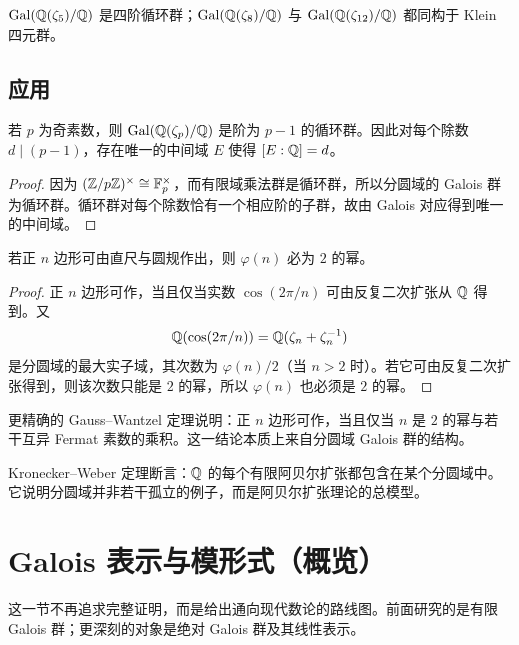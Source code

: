 \begin{example}
$\mathrm{Gal}(\mathbb{Q}(\zeta_5)/\mathbb{Q})$ 是四阶循环群；$\mathrm{Gal}(\mathbb{Q}(\zeta_8)/\mathbb{Q})$ 与 $\mathrm{Gal}(\mathbb{Q}(\zeta_{12})/\mathbb{Q})$ 都同构于 Klein 四元群。
\end{example}

\subsection*{应用}

\begin{proposition}
若 $p$ 为奇素数，则 $\mathrm{Gal}(\mathbb{Q}(\zeta_p)/\mathbb{Q})$ 是阶为 $p-1$ 的循环群。因此对每个除数 $d\mid(p-1)$，存在唯一的中间域 $E$ 使得 $[E:\mathbb{Q}]=d$。
\end{proposition}

\begin{proof}
因为 $(\mathbb{Z}/p\mathbb{Z})^\times\cong\mathbb{F}_p^\times$，而有限域乘法群是循环群，所以分圆域的 Galois 群为循环群。循环群对每个除数恰有一个相应阶的子群，故由 Galois 对应得到唯一的中间域。
\end{proof}

\begin{proposition}[正多边形可作的必要条件]
若正 $n$ 边形可由直尺与圆规作出，则 $\varphi(n)$ 必为 $2$ 的幂。
\end{proposition}

\begin{proof}
正 $n$ 边形可作，当且仅当实数 $\cos(2\pi/n)$ 可由反复二次扩张从 $\mathbb{Q}$ 得到。又
\[
\mathbb{Q}(\cos(2\pi/n))=\mathbb{Q}(\zeta_n+\zeta_n^{-1})
\]
是分圆域的最大实子域，其次数为 $\varphi(n)/2$（当 $n>2$ 时）。若它可由反复二次扩张得到，则该次数只能是 $2$ 的幂，所以 $\varphi(n)$ 也必须是 $2$ 的幂。
\end{proof}

\begin{remark}
更精确的 Gauss--Wantzel 定理说明：正 $n$ 边形可作，当且仅当 $n$ 是 $2$ 的幂与若干互异 Fermat 素数的乘积。这一结论本质上来自分圆域 Galois 群的结构。
\end{remark}

\begin{remark}
Kronecker--Weber 定理断言：$\mathbb{Q}$ 的每个有限阿贝尔扩张都包含在某个分圆域中。它说明分圆域并非若干孤立的例子，而是阿贝尔扩张理论的总模型。
\end{remark}

\section{Galois 表示与模形式（概览）}

这一节不再追求完整证明，而是给出通向现代数论的路线图。前面研究的是有限 Galois 群；更深刻的对象是绝对 Galois 群及其线性表示。

